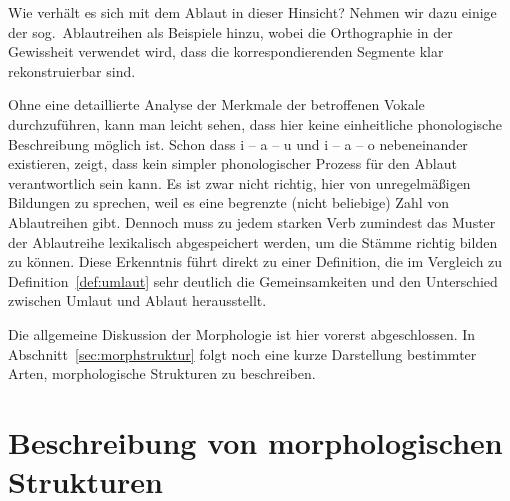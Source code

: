 
Wie verhält es sich mit dem Ablaut in dieser Hinsicht?
Nehmen wir dazu einige der sog.\ Ablautreihen als Beispiele hinzu, wobei die Orthographie in der Gewissheit verwendet wird, dass die korrespondierenden Segmente klar rekonstruierbar sind.

\newpage

\begin{exe}
  \ex\label{ex:morph8827}
  \begin{xlist}
  \end{xlist}
\end{exe}

Ohne eine detaillierte Analyse der Merkmale der betroffenen Vokale durchzuführen, kann man leicht sehen, dass hier keine einheitliche phonologische Beschreibung möglich ist.
Schon dass i -- a -- u und i -- a -- o nebeneinander existieren, zeigt, dass kein simpler phonologischer Prozess für den Ablaut verantwortlich sein kann.
Es ist zwar nicht richtig, hier von unregelmäßigen Bildungen zu sprechen, weil es eine begrenzte (nicht beliebige) Zahl von Ablautreihen gibt.
Dennoch muss zu jedem starken Verb zumindest das Muster der Ablautreihe lexikalisch abgespeichert werden, um die Stämme richtig bilden zu können.
Diese Erkenntnis führt direkt zu einer Definition, die im Vergleich zu Definition~\ref{def:umlaut} sehr deutlich die Gemeinsamkeiten und den Unterschied zwischen Umlaut und Ablaut herausstellt.


Die allgemeine Diskussion der Morphologie ist hier vorerst abgeschlossen.
In Abschnitt~\ref{sec:morphstruktur} folgt noch eine kurze Darstellung bestimmter Arten, morphologische Strukturen zu beschreiben.

\section{Beschreibung von morphologischen Strukturen}

